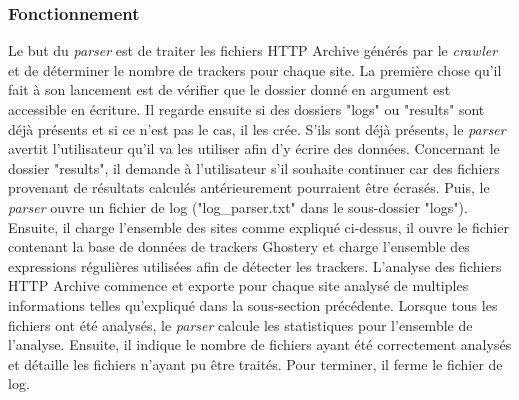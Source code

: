 
\subsubsection{Fonctionnement}
Le but du \textit{parser} est de traiter les fichiers HTTP Archive générés par le \textit{crawler} et de déterminer le nombre de trackers pour chaque site. La première chose qu'il fait à son lancement est de vérifier que le dossier donné en argument est accessible en écriture. Il regarde ensuite si des dossiers "logs" ou "results" sont déjà présents et si ce n'est pas le cas, il les crée. S'ils sont déjà présents, le \textit{parser} avertit l'utilisateur qu'il va les utiliser afin d'y écrire des données. Concernant le dossier "results", il demande à l'utilisateur s'il souhaite continuer car des fichiers provenant de résultats calculés antérieurement pourraient être écrasés. Puis, le \textit{parser} ouvre un fichier de log ("log\_parser.txt" dans le sous-dossier "logs"). Ensuite, il charge l'ensemble des sites comme expliqué ci-dessus, il ouvre le fichier contenant la base de données de trackers Ghostery et charge l'ensemble des expressions régulières utilisées afin de détecter les trackers. L'analyse des fichiers HTTP Archive commence et exporte pour chaque site analysé de multiples informations telles qu'expliqué dans la sous-section précédente. Lorsque tous les fichiers ont été analysés, le \textit{parser} calcule les statistiques pour l'ensemble de l'analyse. Ensuite, il indique le nombre de fichiers ayant été correctement analysés et détaille les fichiers n'ayant pu être traités. Pour terminer, il ferme le fichier de log.
